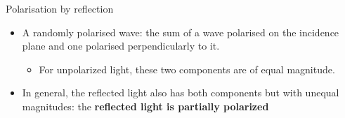 \begin{frame}{Polarisation by reflection}

\begin{itemize}
 \item
     A randomly polarised wave: the sum of a wave polarised
     on the incidence plane and one polarised perpendicularly to it.
    \begin{itemize}
       \item
          For unpolarized light, these two components are of equal magnitude.
    \end{itemize}
  \item
      In general, the reflected light also has both components but
      with unequal magnitudes:
      the {\bf reflected light is partially polarized}
\end{itemize}


\end{frame}
